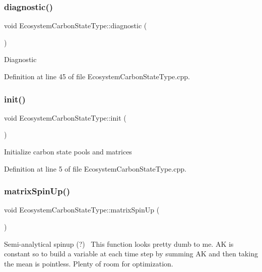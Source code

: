 \subsubsection{\texorpdfstring{diagnostic()}{diagnostic()}}
{\footnotesize\ttfamily void Ecosystem\+Carbon\+State\+Type\+::diagnostic (\begin{DoxyParamCaption}{ }\end{DoxyParamCaption})}

Diagnostic 

Definition at line 45 of file Ecosystem\+Carbon\+State\+Type.\+cpp.

\mbox{\label{class_ecosystem_carbon_state_type_af8446f966b95c51b061ac5199bd8bc26}} 
\subsubsection{\texorpdfstring{init()}{init()}}
{\footnotesize\ttfamily void Ecosystem\+Carbon\+State\+Type\+::init (\begin{DoxyParamCaption}{ }\end{DoxyParamCaption})}

Initialize carbon state pools and matrices 

Definition at line 5 of file Ecosystem\+Carbon\+State\+Type.\+cpp.

\mbox{\label{class_ecosystem_carbon_state_type_a9ea22da7d71c04e00dff17a4f225855a}} 
\subsubsection{\texorpdfstring{matrix\+Spin\+Up()}{matrixSpinUp()}}
{\footnotesize\ttfamily void Ecosystem\+Carbon\+State\+Type\+::matrix\+Spin\+Up (\begin{DoxyParamCaption}{ }\end{DoxyParamCaption})}

Semi-\/analytical spinup (?)~\newline
This function looks pretty dumb to me. AK is constant so to build a variable at each time step by summing AK and then taking the mean is pointless. Plenty of room for optimization. 

